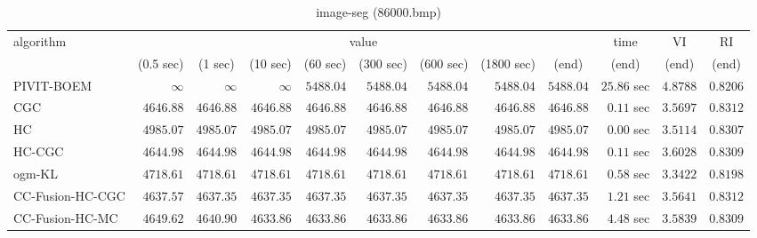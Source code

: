 \begin{table}[H]
\scriptsize
\centering
\caption{image-seg (86000.bmp)}
\label{tab:anytimetable-image-seg-86000.bmp}
\begin{tabular}{lrrrrrrrrrrr}
\toprule
           algorithm &                                   \multicolumn{8}{c}{value} & \multicolumn{1}{c}{time}    & \multicolumn{1}{c}{VI}  & \multicolumn{1}{c}{RI} \\  
\cmidrule(lr){2-9}\cmidrule(lr){10-10} \cmidrule(lr){11-11} \cmidrule(lr){12-12}   
                     & \multicolumn{1}{c}{(0.5 sec)} & \multicolumn{1}{c}{(1 sec)} & \multicolumn{1}{c}{(10 sec)} & \multicolumn{1}{c}{(60 sec)} & \multicolumn{1}{c}{(300 sec)} & \multicolumn{1}{c}{(600 sec)} & \multicolumn{1}{c}{(1800 sec)} & \multicolumn{1}{c}{(end)} & \multicolumn{1}{c}{(end)}    & \multicolumn{1}{c}{(end)}   & \multicolumn{1}{c}{(end)}  \\ \midrule 
          PIVIT-BOEM & $\infty$ & $\infty$ & $\infty$ & $      5488.04$ & $      5488.04$ & $      5488.04$ & $      5488.04$ & $      5488.04$ & $        25.86$ sec    & $       4.8788$  & $       0.8206$ \\ 
                 CGC & $      4646.88$ & $      4646.88$ & $      4646.88$ & $      4646.88$ & $      4646.88$ & $      4646.88$ & $      4646.88$ & $      4646.88$ & $         0.11$ sec    & $       3.5697$  & $       0.8312$ \\ 
                  HC & $      4985.07$ & $      4985.07$ & $      4985.07$ & $      4985.07$ & $      4985.07$ & $      4985.07$ & $      4985.07$ & $      4985.07$ & $         0.00$ sec    & $       3.5114$  & $       0.8307$ \\ 
              HC-CGC & $      4644.98$ & $      4644.98$ & $      4644.98$ & $      4644.98$ & $      4644.98$ & $      4644.98$ & $      4644.98$ & $      4644.98$ & $         0.11$ sec    & $       3.6028$  & $       0.8309$ \\ 
              ogm-KL & $      4718.61$ & $      4718.61$ & $      4718.61$ & $      4718.61$ & $      4718.61$ & $      4718.61$ & $      4718.61$ & $      4718.61$ & $         0.58$ sec    & $       3.3422$  & $       0.8198$ \\ 
    CC-Fusion-HC-CGC & $      4637.57$ & $      4637.35$ & $      4637.35$ & $      4637.35$ & $      4637.35$ & $      4637.35$ & $      4637.35$ & $      4637.35$ & $         1.21$ sec    & $       3.5641$  & $       0.8312$ \\ 
     CC-Fusion-HC-MC & $      4649.62$ & $      4640.90$ & $      4633.86$ & $      4633.86$ & $      4633.86$ & $      4633.86$ & $      4633.86$ & $      4633.86$ & $         4.48$ sec    & $       3.5839$  & $       0.8309$ \\ 

\end{tabular}
\end{table}
